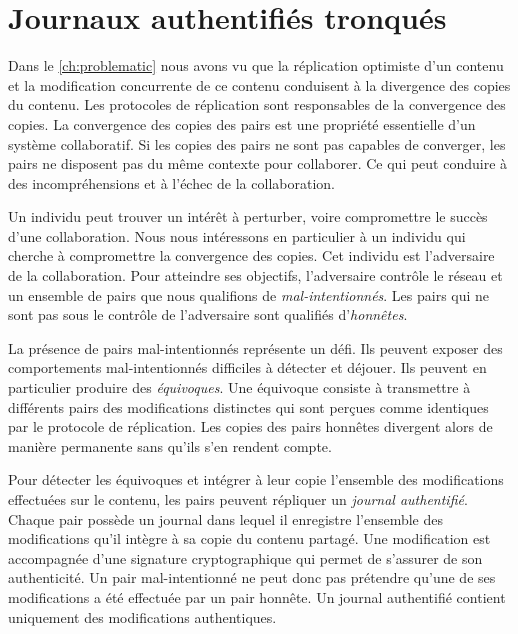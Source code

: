 
\chapter{Journaux authentifiés tronqués}\label{ch:pruned-log}

\minitoc{}
\clearpage

Dans le \autoref{ch:problematic} nous avons vu que la réplication optimiste d'un contenu et la modification concurrente de ce contenu conduisent à la divergence des copies du contenu.
Les protocoles de réplication sont responsables de la convergence des copies.
La convergence des copies des pairs est une propriété essentielle d'un système collaboratif.
Si les copies des pairs ne sont pas capables de converger, les pairs ne disposent pas du même contexte pour collaborer.
Ce qui peut conduire à des incompréhensions et à l'échec de la collaboration.

Un individu peut trouver un intérêt à perturber, voire compromettre le succès d'une collaboration.
Nous nous intéressons en particulier à un individu qui cherche à compromettre la convergence des copies.
Cet individu est l'adversaire de la collaboration.
Pour atteindre ses objectifs, l'adversaire contrôle le réseau et un ensemble de pairs que nous qualifions de \emph{mal-intentionnés}.
Les pairs qui ne sont pas sous le contrôle de l'adversaire sont qualifiés d'\emph{honnêtes}.

La présence de pairs mal-intentionnés représente un défi.
Ils peuvent exposer des comportements mal-intentionnés difficiles à détecter et déjouer.
Ils peuvent en particulier produire des \emph{équivoques}.
Une équivoque consiste à transmettre à différents pairs des modifications distinctes qui sont perçues comme identiques par le protocole de réplication.
Les copies des pairs honnêtes divergent alors de manière permanente sans qu'ils s'en rendent compte.

Pour détecter les équivoques et intégrer à leur copie l'ensemble des modifications effectuées sur le contenu, les pairs peuvent répliquer un \emph{journal authentifié}.
Chaque pair possède un journal dans lequel il enregistre l'ensemble des modifications qu'il intègre à sa copie du contenu partagé.
Une modification est accompagnée d'une signature cryptographique qui permet de s'assurer de son authenticité.
Un pair mal-intentionné ne peut donc pas prétendre qu'une de ses modifications a été effectuée par un pair honnête.
Un journal authentifié contient uniquement des modifications authentiques.

